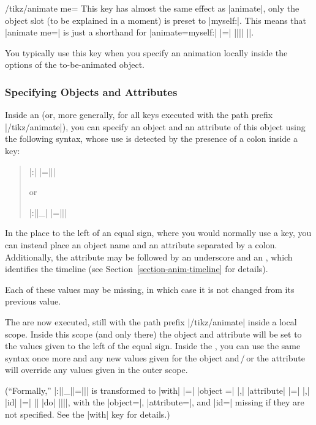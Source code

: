 \begin{key}{/tikz/animate me=}
  This key has almost the same effect as |animate|, only the object
  slot (to be explained in a moment) is preset to |myself:|. This
  means that |animate me=| is just a shorthand for
  |animate={myself:| |=| |{||}| |}|.

  You typically use this key when you specify an animation locally
  inside the options of the to-be-animated object.
\end{key}



\subsubsection{Specifying Objects and Attributes}

\label{section-anim-syntax-obj}

Inside an  (or, more generally, for all
keys executed with the path prefix |/tikz/animate|), you can specify
an object and an attribute of this object using the following syntax,
whose use is detected by the presence of a colon inside a key:
\begin{quote}
  \normalfont
  |:|
  |={||}|
  
  or
  
  |:||_|
  |={||}| 
\end{quote}
In the place to the left of an equal sign, where you would
normally use a key, you can instead place an object name and an
attribute separated by a colon. Additionally, the attribute may be
followed by an underscore and an , which identifies the
timeline (see Section~\ref{section-anim-timeline} for details). 

Each of these values may be missing, in which case it is not changed
from its previous value.

The  are now executed, still with the path prefix
|/tikz/animate| inside a local scope. Inside this scope (and only
there) the object and attribute will be set to the values given to the
left of the equal sign. Inside the , you can use the
same syntax once more and any new values given for the object
and\,/\,or the attribute will override any values given in the outer
scope.

(``Formally,''
|:||_||={||}| is
transformed to |with| |=| |{object =|  |,| |attribute|
|=|  |,| |id| |=|  |}| |do|
|{||}|, with the |object=|, |attribute=|, and |id=|
missing if they are not specified. See the |with| key for details.)

